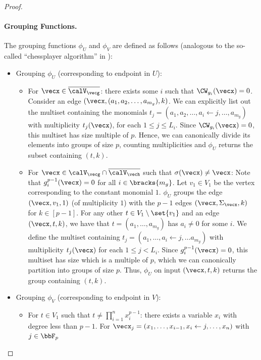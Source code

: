 \begin{proof}
 \paragraph{Grouping Functions.}
      The grouping functions $\phi_U$ and $\phi_V$ are defined as follows (analogous to the so-called ``chessplayer algorithm'' in \cite{r33}):
 \begin{itemize}[label=$\triangleright$,leftmargin=0.5cm]
	\item Grouping $\phi_U$ (corresponding to endpoint in $U$):
\begin{itemize}[leftmargin=0.25cm]
		\item For $\vecx \in \overline{\calV_{\vecg}}$: there exists some $i$ such
		that $\CW_{g_i}(\vecx) = 0$. Consider an edge
		$(\vecx,(a_1,a_2, \dots, a_{m_g}),k)$. We can explicitly list out the multiset containing the monomials
		$t_j = (a_1,a_2, \dots, a_i \gets j, \dots, a_{m_g})$ with multiplicity
	        $t_j(\vecx)$, for each $1 \le j \le L_i$. Since $\CW_{g_i}(\vecx) = 0$, this multiset has size
		multiple of $p$. Hence, we can canonically divide its elements into groups of
		size $p$, counting multiplicities and $\phi_U$ returns the subset containing $(t,k)$.
		\item For $\vecx \in \calV_{\vecg} \cap \overline{\calV_{\vech}}$ such that $\sigma(\vecx) \ne \vecx$: Note that $g_{i}^{p-1}(\vecx) = 0$ for all $i \in \bracks{m_g}$.
		Let $v_1 \in V_1$ be the vertex corresponding to the
		constant monomial $1$. $\phi_U$ groups the edge $(\vecx, v_1, 1)$ (of multiplicity $1$) with the $p-1$ edges $(\vecx, \Sigma_{\vecx}, k)$ for $k \in [p-1]$.
		For any other $t \in  V_1 \setminus \set{v_1}$ and an edge $(\vecx, t,k)$, we have that
		$t = (a_1,\dots, a_{m_g})$ has $a_i \ne 0$ for some $i$. We define
		the multiset containing $t_j = (a_1, \dots, a_{i} \gets j, \dots a_{m_g})$
		with multiplicity $t_j(\vecx)$ for each $1 \le j < L_i$. Since
		$g_{i}^{p-1}(\vecx) = 0$, this multiset has size which is a multiple of $p$, which we can canonically partition into groups of size $p$. Thus, $\phi_U$ on input
		$(\vecx, t, k)$ returns the group containing $(t,k)$.
 	\end{itemize}
	\item Grouping $\phi_V$ (corresponding to endpoint in $V$):
		\begin{itemize}[leftmargin=0.25cm]
		\item For $t \in V_1$ such that $t \neq \prod\limits_{i = 1}^n x_i^{p-1}$:
		there exists a variable $x_i$ with degree less than $p-1$. For
		$\vecx_j = (x_1, \dots, x_{i-1}, x_i \gets j, \dots, x_n)$ with $j \in \bbF_p$

\end{itemize}
\end{itemize}
\end{proof}
